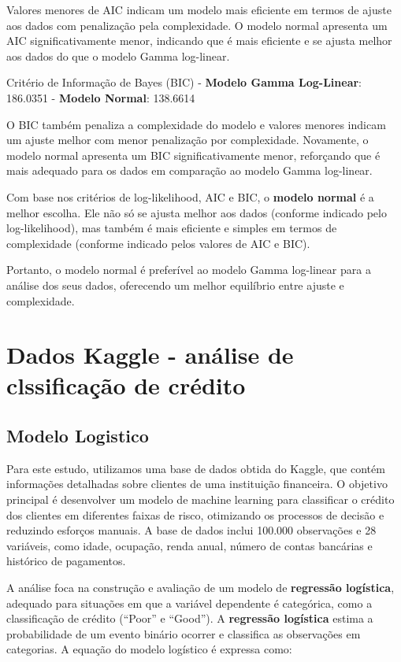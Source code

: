 \documentclass[
  letterpaper,
  DIV=11,
  numbers=noendperiod]{scrreprt}
\begin{document}
Valores menores de AIC indicam um modelo mais eficiente em termos de
ajuste aos dados com penalização pela complexidade. O modelo normal
apresenta um AIC significativamente menor, indicando que é mais
eficiente e se ajusta melhor aos dados do que o modelo Gamma log-linear.

Critério de Informação de Bayes (BIC) - \textbf{Modelo Gamma
Log-Linear}: 186.0351 - \textbf{Modelo Normal}: 138.6614

O BIC também penaliza a complexidade do modelo e valores menores indicam
um ajuste melhor com menor penalização por complexidade. Novamente, o
modelo normal apresenta um BIC significativamente menor, reforçando que
é mais adequado para os dados em comparação ao modelo Gamma log-linear.

Com base nos critérios de log-likelihood, AIC e BIC, o \textbf{modelo
normal} é a melhor escolha. Ele não só se ajusta melhor aos dados
(conforme indicado pelo log-likelihood), mas também é mais eficiente e
simples em termos de complexidade (conforme indicado pelos valores de
AIC e BIC).

Portanto, o modelo normal é preferível ao modelo Gamma log-linear para a
análise dos seus dados, oferecendo um melhor equilíbrio entre ajuste e
complexidade.

\chapter{Dados Kaggle - análise de clssificação de
crédito}\label{dados-kaggle---anuxe1lise-de-clssificauxe7uxe3o-de-cruxe9dito}

\section{Modelo Logistico}\label{modelo-logistico}

Para este estudo, utilizamos uma base de dados obtida do Kaggle, que
contém informações detalhadas sobre clientes de uma instituição
financeira. O objetivo principal é desenvolver um modelo de machine
learning para classificar o crédito dos clientes em diferentes faixas de
risco, otimizando os processos de decisão e reduzindo esforços manuais.
A base de dados inclui 100.000 observações e 28 variáveis, como idade,
ocupação, renda anual, número de contas bancárias e histórico de
pagamentos.

A análise foca na construção e avaliação de um modelo de
\textbf{regressão logística}, adequado para situações em que a variável
dependente é categórica, como a classificação de crédito (``Poor'' e
``Good''). A \textbf{regressão logística} estima a probabilidade de um
evento binário ocorrer e classifica as observações em categorias. A
equação do modelo logístico é expressa como:
\end{document}
